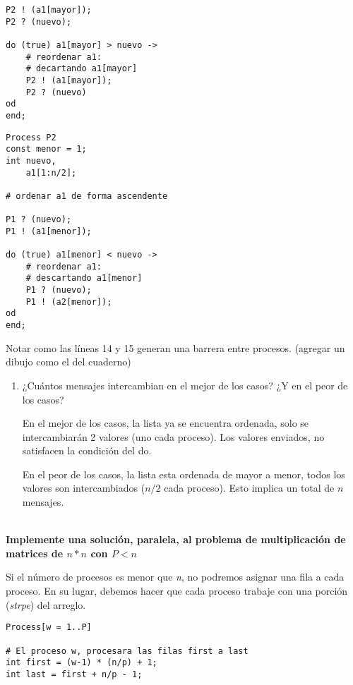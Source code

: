 \documentclass[a4paper, 10pt]{article}
\newenvironment{QandA}{
    \begin{enumerate}\bfseries}
    {\end{enumerate}
}
\newenvironment{answered}{\par\normalfont}{}
\begin{document}
\begin{QandA}
\begin{answered}
\begin{minipage}[t]{.5\linewidth}
\begin{lstlisting}
P2 ! (a1[mayor]);
P2 ? (nuevo);

do (true) a1[mayor] > nuevo ->
    # reordenar a1:
    # decartando a1[mayor]
    P2 ! (a1[mayor]);
    P2 ? (nuevo)
od
end;
\end{lstlisting}
\end{minipage}
\begin{minipage}[t]{.5\linewidth}
\begin{lstlisting}
Process P2
const menor = 1;
int nuevo,
    a1[1:n/2];

# ordenar a1 de forma ascendente

P1 ? (nuevo);
P1 ! (a1[menor]);

do (true) a1[menor] < nuevo ->
    # reordenar a1:
    # descartando a1[menor]
    P1 ? (nuevo);
    P1 ! (a2[menor]);
od
end;
\end{lstlisting}
\end{minipage}

Notar como las líneas 14 y 15 generan una barrera entre procesos. (agregar un dibujo como el del cuaderno)
\end{answered}
\begin{enumerate}[label=\alph*)]
\item ¿Cuántos mensajes intercambian en el mejor de los casos? ¿Y en el peor de los casos?
\begin{answered}
En el mejor de los casos, la lista ya se encuentra ordenada, solo se intercambiarán 2 valores (uno cada proceso). Los valores enviados, no satisfacen la condición del do.

En el peor de los casos, la lista esta ordenada de mayor a menor, todos los valores son intercambiados ($n/2$ cada proceso). Esto implica un total de $n$ mensajes.
\end{answered}
\end{enumerate}

{\large \textbf{\\Implemente una solución, paralela, al problema de multiplicación de matrices de $n*n$ con $P<n$}}

Si el número de procesos es menor que \emph{n}, no podremos asignar una fila a cada proceso. En su lugar, debemos hacer que cada proceso trabaje con una porción (\emph{strpe}) del arreglo.

\begin{lstlisting}
Process[w = 1..P]

# El proceso w, procesara las filas first a last
int first = (w-1) * (n/p) + 1;
int last = first + n/p - 1;


\end{lstlisting}
\end{QandA}
\end{document}
